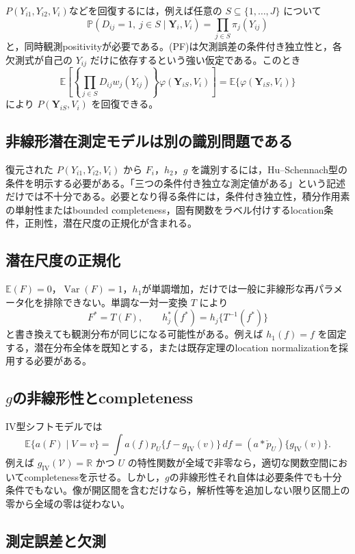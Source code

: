 \documentclass[a4paper,11pt,xelatex,ja=standard]{bxjsarticle}
\newcommand{\E}{\mathbb E}
\newcommand{\Prb}{\mathbb P}
\newcommand{\Y}{\bm Y}
\begin{document}
$P(Y_{i1},Y_{i2},V_i)$などを回復するには，例えば任意の $S\subseteq\{1,\ldots,J\}$ について
\[
\Prb(D_{ij}=1,\ j\in S\mid\Y_i,V_i)
=\prod_{j\in S}\pi_j(Y_{ij})
\tag{PF}
\]
と，同時観測positivityが必要である。(PF)は欠測誤差の条件付き独立性と，各欠測式が自己の $Y_{ij}$ だけに依存するという強い仮定である。このとき
\[
\E\!\left[
\left\{\prod_{j\in S}D_{ij}w_j(Y_{ij})\right\}
\varphi(\Y_{iS},V_i)
\right]
=\E\{\varphi(\Y_{iS},V_i)\}
\]
により $P(\Y_{iS},V_i)$ を回復できる。

\subsection{非線形潜在測定モデルは別の識別問題である}

復元された $P(Y_{i1},Y_{i2},V_i)$ から $F_i$，$h_2$，$g$ を識別するには，Hu--Schennach型の条件を明示する必要がある。「三つの条件付き独立な測定値がある」という記述だけでは不十分である。必要となり得る条件には，条件付き独立性，積分作用素の単射性またはbounded completeness，固有関数をラベル付けするlocation条件，正則性，潜在尺度の正規化が含まれる。

\subsection{潜在尺度の正規化}

$\E(F)=0$，$\operatorname{Var}(F)=1$，$h_1$が単調増加，だけでは一般に非線形な再パラメータ化を排除できない。単調な一対一変換 $T$ により
\[
F^*=T(F),
\qquad
h_j^*(f^*)=h_j\{T^{-1}(f^*)\}
\]
と書き換えても観測分布が同じになる可能性がある。例えば $h_1(f)=f$ を固定する，潜在分布全体を既知とする，または既存定理のlocation normalizationを採用する必要がある。

\subsection{\texorpdfstring{$g$}{g}の非線形性とcompleteness}

IV型シフトモデルでは
\[
\E\{a(F)\mid V=v\}
=\int a(f)p_U\{f-g_{\mathrm{IV}}(v)\}\,df
=(a*\check p_U)\{g_{\mathrm{IV}}(v)\}.
\]
例えば $g_{\mathrm{IV}}(\mathcal V)=\mathbb R$ かつ $U$ の特性関数が全域で非零なら，適切な関数空間においてcompletenessを示せる。しかし，$g$の非線形性それ自体は必要条件でも十分条件でもない。像が開区間を含むだけなら，解析性等を追加しない限り区間上の零から全域の零は従わない。

\subsection{測定誤差と欠測}
\end{document}
